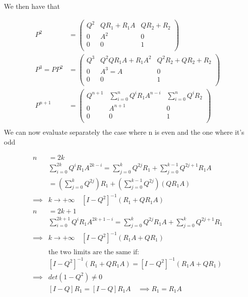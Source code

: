 We then have that

\begin{equation}\begin{split}
	P^2&=\begin{pmatrix}
		Q^2 & Q R_1 + R_1 A & Q R_2 + R_2\\
		0 & A^2  & 0 \\
		0 & 0  & 1 \\
	\end{pmatrix}
	\\
	P^{3} = P P^2 &=\begin{pmatrix}
		Q^3 & Q^2 Q R_1 A + R_1 A^2 & Q^2 R_2 + Q R_2 +R_2\\
		0 & A^3=A  & 0 \\
		0 & 0  & 1 \\
	\end{pmatrix}\\
	P^{n+1}&=\begin{pmatrix}
		Q^{n+1} & \sum\limits_{i=0}^n Q^i R_1 A^{n-i} & \sum\limits_{i=0}^n Q^i R_2\\
		0 & A^{n+1}  & 0 \\
		0 & 0  & 1 \\
	\end{pmatrix}\\
\end{split}\end{equation}
We can now evaluate separately the case where n is even and the one where it's odd

\begin{equation}\begin{split}
	n &= 2 k \\
	&\sum\limits_{i=0}^{2k}Q^i R_1 A^{2k-i} = \sum\limits_{j=0}^{k}Q^{2j} R_1 + \sum\limits_{j=0}^{k-1}Q^{2j+1} R_1 A \\
	&=\left(\sum\limits_{j=0}^{k}Q^{2j} \right) R_1 + \left(\sum\limits_{j=0}^{k-1}Q^{2j} \right) (Q R_1 A)\\
	\implies & k \to +\infty \quad [I - Q^2]^{-1} (R_1 + Q R_1 A)\\
	n &= 2 k + 1 \\
	&\sum\limits_{i=0}^{2k+1}Q^i R_1 A^{2k+1-i} = \sum\limits_{j=0}^{k}Q^{2j} R_1 A + \sum\limits_{j=0}^{k}Q^{2j+1} R_1 \\
	\implies & k \to +\infty \quad [I - Q^2]^{-1} (R_1 A + Q R_1 ) \\
	\\
	&\text{the two limits are the same if: }\\
	& [I - Q^2]^{-1} (R_1 + Q R_1 A) = [I - Q^2]^{-1} (R_1 A + Q R_1 )\\
	\implies & det(1-Q^2)\neq 0\\
	& [I-Q ] R_1 = [I-Q] R_1 A \quad \implies R_1 = R_1 A
\end{split}\end{equation}


